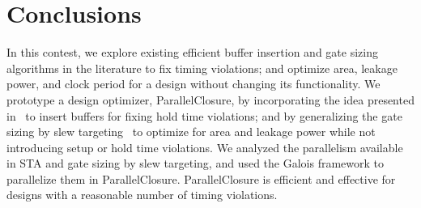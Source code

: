 \section{Conclusions}
\label{sec:conclusions}

In this contest, we explore existing efficient buffer insertion and gate sizing algorithms in the literature to fix timing violations; and optimize area, leakage power, and clock period for a design without changing its functionality. We prototype a design optimizer, ParallelClosure, by incorporating the idea presented in~\cite{Shenoy:Minimum} to insert buffers for fixing hold time violations; and by generalizing the gate sizing by slew targeting~\cite{Held:Gate} to optimize for area and leakage power while not introducing setup or hold time violations. We analyzed the parallelism available in STA and gate sizing by slew targeting, and used the Galois framework to parallelize them in ParallelClosure. ParallelClosure is efficient and effective for designs with a reasonable number of timing violations.
